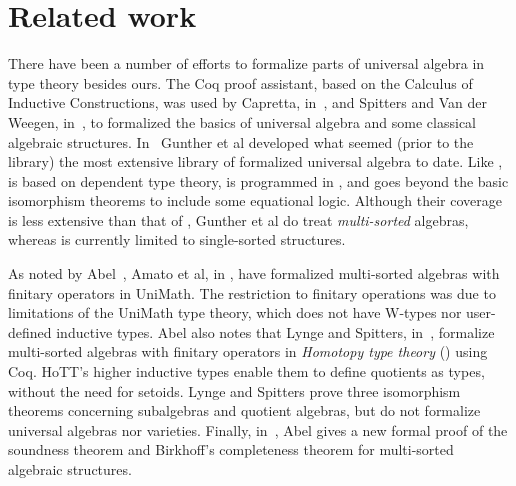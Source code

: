 \section{Related work}
There have been a number of efforts to formalize parts of universal algebra in
type theory besides ours. The Coq proof assistant, based on the Calculus of
Inductive Constructions, was used by Capretta, in~\cite{Capretta:1999}, and
Spitters and Van der Weegen, in~\cite{Spitters:2011}, to formalized the basics
of universal algebra and some classical algebraic structures.
In~\cite{Gunther:2018} Gunther et al developed what seemed (prior to the \agdaalgebras
library) the most extensive library of formalized universal algebra to date.
Like \agdaalgebras,~\cite{Gunther:2018} is based on dependent type theory, is programmed
in \agda, and goes beyond the basic isomorphism theorems to include some equational logic.
Although their coverage is less extensive than that of \agdaalgebras, Gunther et al do treat
\emph{multi-sorted} algebras, whereas \agdaalgebras is currently limited to single-sorted structures.

As noted by Abel~\cite{Abel:2021}, Amato et al, in \cite{Amato:2021}, have
formalized multi-sorted algebras with finitary operators in UniMath. The restriction to
finitary operations was due to limitations of the UniMath type theory, which does
not have W-types nor user-defined inductive types.
Abel also notes that Lynge and Spitters, in~\cite{Lynge:2019}, formalize multi-sorted
algebras with finitary operators in \emph{Homotopy type theory} (\cite{HoTT}) using
Coq.  HoTT's higher inductive types enable them to define quotients as types, without
the need for setoids.  Lynge and Spitters prove three isomorphism theorems concerning
subalgebras and quotient algebras, but do not formalize universal algebras nor varieties.
Finally, in~\cite{Abel:2021}, Abel gives a new formal proof of the soundness theorem and
Birkhoff's completeness theorem for multi-sorted algebraic structures.


